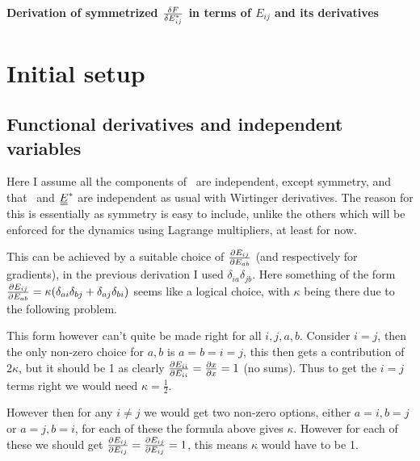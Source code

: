 \documentclass[11pt]{article}
\begin{document}
\begin{center}
    \LARGE
    \textbf{Derivation of symmetrized $\fdv{F}{E_{ij}^*}$ in terms of $E_{ij}$ and its derivatives}
\end{center}
\vspace{1em}
\section{Initial setup}
\subsection{Functional derivatives and independent variables}
Here I assume all the components of \EE\ are independent, except symmetry, and that \EE\ and $\du{E}^*$ are independent as usual with Wirtinger derivatives.
The reason for this is essentially as symmetry is easy to include, unlike the others which will be enforced for the dynamics using Lagrange multipliers, at least for now.

This can be achieved by a suitable choice of $\pdv{E_{ij}}{E_{ab}}$ (and respectively for gradients), in the previous derivation I used $\delta_{ia}\delta_{jb}$.
Here something of the form $\pdv{E_{ij}}{E_{ab}} = \kappa(\delta_{ai}\delta_{bj} + \delta_{aj}\delta_{bi})$ seems like a logical choice, with $\kappa$ being there due to the following problem.

This form however can't quite be made right for all $i,j,a,b$.
Consider $i=j$, then the only non-zero choice for $a,b$ is $a=b=i=j$, this then gets a contribution of $2\kappa$, but it should be 1 as clearly $\pdv{E_{ii}}{E_{ii}} = \pdv{x}{x}=1$ (no sums).
Thus to get the $i=j$ terms right we would need $\kappa=\frac{1}{2}$.

However then for any $i\neq j$ we would get two non-zero options, either $a=i,b=j$ or $a=j,b=i$, for each of these the formula above gives $\kappa$.
However for each of these we should get $\pdv{E_{ij}}{E_{ij}} = \pdv{E_{ij}}{E_{ij}} = 1$, this means $\kappa$ would have to be 1.
\end{document}
